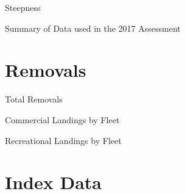 \documentclass[ignorenonframetext,]{beamer}
\begin{document}
\begin{frame}{Steepness}

\end{frame}

\begin{frame}{Summary of Data used in the 2017 Assessment}

\end{frame}

\section{Removals}\label{removals}

\begin{frame}{Total Removals}

\end{frame}

\begin{frame}{Commercial Landings by Fleet}

\end{frame}

\begin{frame}{Recreational Landings by Fleet}

\end{frame}

\section{Index Data}\label{index-data}
\end{document}
